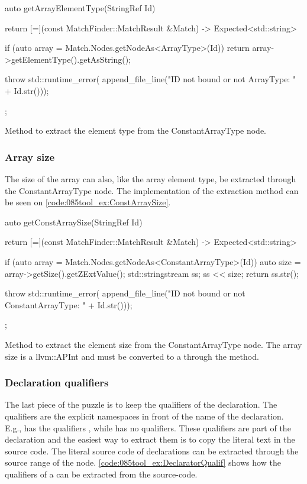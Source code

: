 \begin{listing}[H]
    \begin{cppcode}
auto getArrayElementType(StringRef Id) {
    return [=](const MatchFinder::MatchResult &Match) -> Expected<std::string> {
        if (auto array = Match.Nodes.getNodeAs<ArrayType>(Id)) {
            return array->getElementType().getAsString();
        }

        throw std::runtime_error(
			    append_file_line("ID not bound or not ArrayType: " + Id.str()));
    };
}
    \end{cppcode}
    \caption{Method to extract the element type from the ConstantArrayType node.}
    \label{code:085tool_ex:ArrayElemtType}
\end{listing}

\subsubsection*{Array size}

The size of the array can also, like the array element type, be extracted through the ConstantArrayType node. The implementation of the extraction method can be seen on \cref{code:085tool_ex:ConstArraySize}.

\begin{listing}[H]
    \begin{cppcode}
auto getConstArraySize(StringRef Id) {
    return [=](const MatchFinder::MatchResult &Match) -> Expected<std::string> {
        if (auto array = Match.Nodes.getNodeAs<ConstantArrayType>(Id)) {
            auto size = array->getSize().getZExtValue();
            std::stringstream ss;
            ss << size;
            return ss.str();
        }

        throw std::runtime_error(
			    append_file_line("ID not bound or not ConstantArrayType: " + Id.str()));
    };
}
    \end{cppcode}
    \caption{Method to extract the element size from the ConstantArrayType node. The array size is a llvm::APInt and must be converted to a  through the  method.}
    \label{code:085tool_ex:ConstArraySize}
\end{listing}

\subsubsection*{Declaration qualifiers}

The last piece of the puzzle is to keep the qualifiers of the declaration. The qualifiers are the explicit namespaces in front of the name of the declaration. E.g.,  has the qualifiers , while  has no qualifiers. These qualifiers are part of the declaration and the easiest way to extract them is to copy the literal text in the source code. The literal source code of declarations can be extracted through the source range of the node. \cref{code:085tool_ex:DeclaratorQualif} shows how the qualifiers of a  can be extracted from the source-code.

